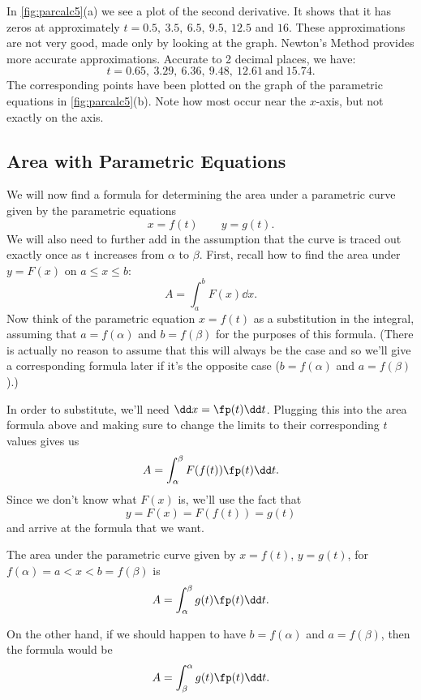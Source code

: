 \begin{example}
In \autoref{fig:parcalc5}(a) we see a plot of the second derivative. It shows that it has zeros at approximately $t=0.5,\ 3.5,\ 6.5,\ 9.5,\ 12.5$ and $16$. These approximations are not very good, made only by looking at the graph. Newton's Method provides more accurate approximations. Accurate to 2 decimal places, we have:
\[t=0.65,\ 3.29,\ 6.36,\ 9.48,\ 12.61\ \text{and}\ 15.74.\]
The corresponding points have been plotted on the graph of the parametric equations in \autoref{fig:parcalc5}(b). Note how most occur near the $x$-axis, but not exactly on the axis.
\end{example}


\subsection{Area with Parametric Equations}

We will now find a formula for determining the area under a parametric curve given by the parametric equations
\[x=f(t)\qquad y=g(t).\]
We will also need to further add in the assumption that the curve is traced out exactly once as t increases from $\alpha$ to $\beta$.
%
First, recall how to find the area under $y=F(x)$ on $a\le x\le b$:
\[A=\int_a^b F(x)\dd x.\]
Now think of the parametric equation $x=f(t)$ as a substitution in the integral, assuming that $a=f(\alpha)$ and $b=f(\beta)$ for the purposes of this formula.  (There is actually no reason to assume that this will always be the case and so we'll give a corresponding formula later if it's the opposite case ($b=f(\alpha)$ and $a=f(\beta)$).)

In order to substitute, we'll need $\dd x=\fp(t)\dd t$. Plugging this into the area formula above and making sure to change the limits to their corresponding $t$ values gives us
\[A=\int_\alpha^\beta F(f(t))\fp(t)\dd t.\]
Since we don't know what $F(x)$ is, we'll use the fact that
\[y=F(x)=F(f(t))=g(t)\]
and arrive at the formula that we want.

\begin{keyidea}\label{ki_param_area}
The area under the parametric curve given by $x=f(t)$, $y=g(t)$, for $f(\alpha)=a<x<b=f(\beta)$ is
\[A=\int_\alpha^\beta g(t)\fp(t)\dd t.\]
\end{keyidea}

On the other hand, if we should happen to have $b=f(\alpha)$ and $a=f(\beta)$, then the formula would be
\[A=\int_\beta^\alpha g(t)\fp(t)\dd t.\]

